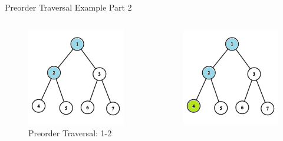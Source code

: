 \documentclass[aspectratio=169]{beamer}%
\begin{document}
\begin{frame}{Preorder Traversal Example Part 2}
    \begin{columns}
        \begin{column}{0.32\textwidth}
            \begin{figure}
                \centering
                \includegraphics[width = .9\linewidth]{tree-pre 4.png}
                \caption{Preorder Traversal: 1-2}
            \end{figure}
        \end{column}
        \hfill
        \begin{column}{0.32\textwidth}
            \begin{figure}
                \centering
                \includegraphics[width = .9\linewidth]{tree-pre 5.png}

\end{figure}
\end{column}
\end{columns}
\end{frame}
\end{document}
